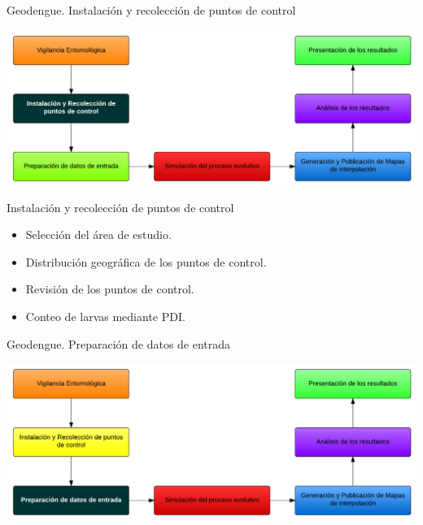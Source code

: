 
\begin{frame}[c]{Geodengue. Instalación y recolección de puntos de control}
\begin{center}
    \includegraphics[width=\textwidth]{./graphics/propuesta-puntos-control.png}
\end{center}
\end{frame}

\begin{frame}[c]{Instalación y recolección de puntos de control}
  \begin{center}
    \begin{itemize}
      \item Selección del área de estudio.
      \item Distribución geográfica de los puntos de control.
      \item Revisión de los puntos de control.
      \item Conteo de larvas mediante PDI.
    \end{itemize}
  \end{center}
\end{frame}

\begin{frame}[c]{Geodengue. Preparación de datos de entrada}
\begin{center}
    \includegraphics[width=\textwidth]{./graphics/propuesta-datos-entrada.png}
\end{center}
\end{frame}

